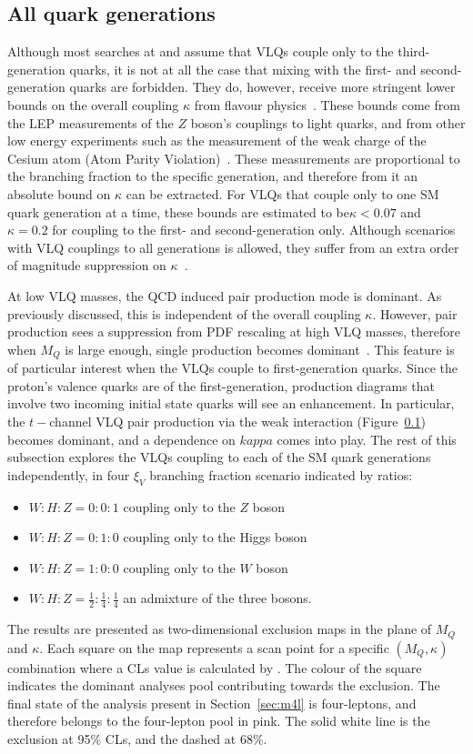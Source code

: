 \subsection{All quark generations}
Although most searches at \ATLAS and \CMS assume that VLQs couple only to the third-generation quarks, it is not at all the case that mixing with the first- and second-generation quarks are forbidden. They do, however, receive more stringent lower bounds on the overall coupling $\kappa$ from flavour physics~\cite{Buchkremer_2013}. These bounds come from the LEP measurements of the $Z$ boson's couplings to light quarks, and from other low energy experiments such as the measurement of the weak charge of the Cesium atom (Atom Parity Violation)~\cite{}. These measurements are proportional to the branching fraction to the specific generation, and therefore from it an absolute bound on $\kappa$ can be extracted. For VLQs that couple only to one SM quark generation at a time, these bounds are estimated to be$\kappa<0.07$ and $\kappa=0.2$ for coupling to the first- and second-generation only. Although scenarios with VLQ couplings to all generations is allowed, they suffer from an extra order of magnitude suppression on $\kappa$~\cite{}. 

At low VLQ masses, the QCD induced pair production mode is dominant. As previously discussed, this is independent of the overall coupling $\kappa$. However, pair production sees a suppression from PDF rescaling at high VLQ masses, therefore when $M_Q$ is large enough, single production becomes dominant~\cite{Panizzi:2014dwa}. This feature is of particular interest when the VLQs couple to first-generation quarks. Since the proton's valence quarks are of the first-generation, production diagrams that involve two incoming initial state quarks will see an enhancement. In particular, the $t-$channel VLQ pair production via the weak interaction (Figure~\ref{}) becomes dominant, and a dependence on $kappa$ comes into play. 
The rest of this subsection explores the VLQs coupling to each of the SM quark generations independently, in four $\xi_V$ branching fraction scenario indicated by ratios: 
\begin{itemize}
	\item{$W:H:Z=0:0:1$ coupling only to the $Z$ boson}
	\item{$W:H:Z=0:1:0$ coupling only to the Higgs boson}
	\item{$W:H:Z=1:0:0$ coupling only to the $W$ boson}
	\item{$W:H:Z=\frac{1}{2}:\frac{1}{4}:\frac{1}{4}$ an admixture of the three bosons}.
\end{itemize}
The results are presented as two-dimensional exclusion maps in the plane of $M_Q$ and $\kappa$. Each square on the map represents a scan point for a specific $(M_Q,\kappa)$ combination where a CLs value is calculated by \contur. The colour of the square indicates the dominant analyses pool contributing towards the exclusion. The final state of the \ATLAS analysis present in Section~\ref{sec:m4l} is four-leptons, and therefore belongs to the four-lepton pool in pink. The solid white line is the exclusion at 95\% CLs, and the dashed at 68\%. 

